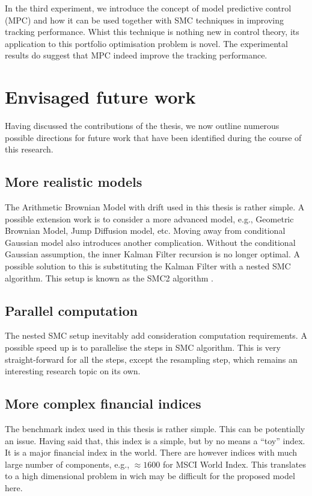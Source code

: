 In the third experiment, we introduce the concept of model predictive control (MPC) and how it can be used together with SMC techniques in improving tracking performance. Whist this technique is nothing new in control theory, its application to this portfolio optimisation problem is novel. The experimental results do suggest that MPC indeed improve the tracking performance.

\section{Envisaged future work}
Having discussed the contributions of the thesis, we now outline
numerous possible directions for future work that have been identified
during the course of this research.

\subsection{More realistic models}
The Arithmetic Brownian Model with drift used in this thesis is rather simple. A possible extension work is to consider a more advanced model, e.g., Geometric Brownian Model, Jump Diffusion model, etc. Moving away from conditional Gaussian model also introduces another complication. Without the conditional Gaussian assumption, the inner Kalman Filter recursion is no longer optimal. A possible solution to this is substituting the Kalman Filter with a nested SMC algorithm. This setup is known as the SMC2 algorithm \cite{CN13}.

\subsection{Parallel computation}
The nested SMC setup inevitably add consideration computation requirements. A possible speed up is to parallelise the steps in SMC algorithm. This is very straight-forward for all the steps, except the resampling step, which remains an interesting research topic on its own. 

\subsection{More complex financial indices}
The benchmark index used in this thesis is rather simple. This can
be potentially an issue. Having said that, this index is a simple, but by no means a ``toy''
index. It is a major financial index in the world. There are however indices with much large number of components, e.g., $\approx 1600$ for MSCI World Index. This translates to a high dimensional problem in wich may be difficult for the proposed model here.

